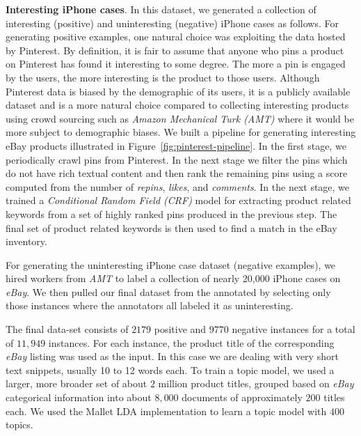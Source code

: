 {\bf Interesting iPhone cases}.
In this dataset, we generated a collection of interesting (positive) and uninteresting (negative) iPhone cases as follows. For generating positive examples, one natural choice was exploiting the data hosted by Pinterest. By definition, it is fair to assume that anyone who pins a product on Pinterest has found it interesting to some degree. The more a pin is engaged by the users, the more interesting is the product to those users. Although Pinterest data is biased by the demographic of its users, it is a publicly available dataset and is a more natural choice compared to collecting interesting products using crowd sourcing such as  {\em Amazon Mechanical Turk (AMT)} where it would be more subject to demographic biases. We built a pipeline for generating interesting eBay products illustrated in Figure~\ref{fig:pinterest-pipeline}.  In the first stage, we periodically crawl pins from Pinterest. In the next stage we filter the pins which do not have rich textual content and then rank the remaining pins using a score computed from the number of {\em repins}, {\em likes}, and {\em comments}. In the next stage, we trained a {\em Conditional Random Field (CRF)} model for extracting product related keywords from a set of highly ranked pins produced in the previous step. The final set of product related keywords  is then used to find a match in the eBay inventory. 

For generating the uninteresting iPhone case dataset (negative examples), we
hired workers from {\em AMT} to label a collection
of nearly 20,000 iPhone cases on {\em eBay}.  We then pulled our final dataset from the annotated by selecting only those instances where the annotators all labeled it as uninteresting. 

The final data-set consists of $2179$ positive and $9770$ negative instances
for a total of $11,949$ instances. For each instance, the product title of
the corresponding {\em eBay} listing was used as the input. In this case we are
dealing with very short text snippets, usually 10 to 12 words each. To
train a topic model, we used a larger, more broader set of about
$2$ million product titles, grouped based on {\em eBay} categorical information into about $8,000$
documents of approximately $200$ titles each. We used the Mallet LDA
implementation to learn a topic model with $400$ topics.



